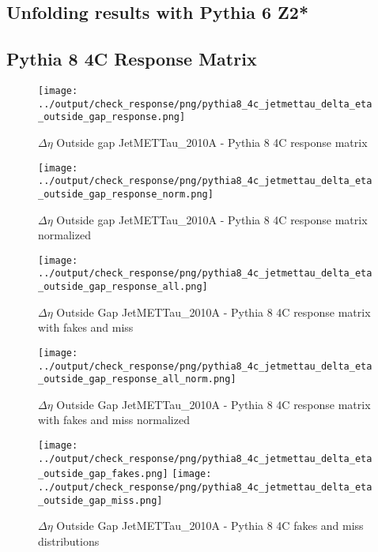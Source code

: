 \documentclass[11pt]{book}
\begin{document}
\clearpage
\subsection{Unfolding results with Pythia 6 Z2*}


\clearpage
\subsection{Pythia 8 4C Response Matrix}


\begin{figure}[ht]
\centering
\texttt{[image: ../output/check\_response/png/pythia8\_4c\_jetmettau\_delta\_eta\_outside\_gap\_response.png]}
\caption{$\Delta\eta$ Outside gap JetMETTau\_2010A - Pythia 8 4C response matrix}
\label{p8_jetmettau_delta_eta_outside_gap_response}
\end{figure}

\begin{figure}[ht]
\centering
\texttt{[image: ../output/check\_response/png/pythia8\_4c\_jetmettau\_delta\_eta\_outside\_gap\_response\_norm.png]}
\caption{$\Delta\eta$ Outside gap JetMETTau\_2010A - Pythia 8 4C response matrix normalized}
\label{p8_jetmettau_delta_eta_outside_gap_response_norm}
\end{figure}

\begin{figure}[ht]
\centering
\texttt{[image: ../output/check\_response/png/pythia8\_4c\_jetmettau\_delta\_eta\_outside\_gap\_response\_all.png]}
\caption{$\Delta\eta$ Outside Gap JetMETTau\_2010A - Pythia 8 4C response matrix with fakes and miss}
\label{p8_jetmettau_delta_eta_outside_gap_response_all}
\end{figure}

\begin{figure}[ht]
\centering
\texttt{[image: ../output/check\_response/png/pythia8\_4c\_jetmettau\_delta\_eta\_outside\_gap\_response\_all\_norm.png]}
\caption{$\Delta\eta$ Outside Gap JetMETTau\_2010A - Pythia 8 4C response matrix with fakes and miss normalized}
\label{p8_jetmettau_delta_eta_outside_gap_response_all_norm}
\end{figure}

\begin{figure}[ht]
\centering
\texttt{[image: ../output/check\_response/png/pythia8\_4c\_jetmettau\_delta\_eta\_outside\_gap\_fakes.png]}
\texttt{[image: ../output/check\_response/png/pythia8\_4c\_jetmettau\_delta\_eta\_outside\_gap\_miss.png]}
\caption{$\Delta\eta$ Outside Gap JetMETTau\_2010A - Pythia 8 4C fakes and miss distributions}
\label{p8_jetmettau_delta_eta_outside_gap_fakesmiss}
\end{figure}
\end{document}
